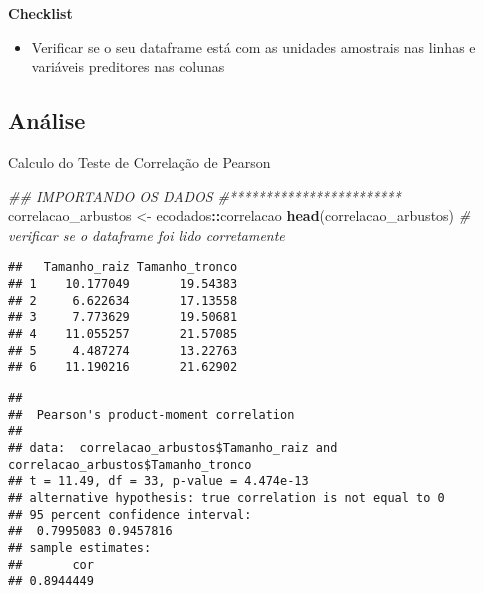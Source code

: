 \documentclass[
]{book}
\newenvironment{Shaded}{\begin{snugshade}}{\end{snugshade}}
\newcommand{\CommentTok}[1]{\textcolor[rgb]{0.56,0.35,0.01}{\textit{#1}}}
\newcommand{\DataTypeTok}[1]{\textcolor[rgb]{0.13,0.29,0.53}{#1}}
\newcommand{\KeywordTok}[1]{\textcolor[rgb]{0.13,0.29,0.53}{\textbf{#1}}}
\newcommand{\NormalTok}[1]{#1}
\newcommand{\OperatorTok}[1]{\textcolor[rgb]{0.81,0.36,0.00}{\textbf{#1}}}
\newcommand{\StringTok}[1]{\textcolor[rgb]{0.31,0.60,0.02}{#1}}
\providecommand{\tightlist}{%
  \setlength{\itemsep}{0pt}\setlength{\parskip}{0pt}}
\begin{document}
\textbf{Checklist}

\begin{itemize}
\tightlist
\item
  Verificar se o seu dataframe está com as unidades amostrais nas linhas e variáveis preditores nas colunas
\end{itemize}

\hypertarget{anuxe1lise-3}{%
\subsection{Análise}\label{anuxe1lise-3}}

Calculo do Teste de Correlação de Pearson

\begin{Shaded}
\begin{Highlighting}[]
\CommentTok{## IMPORTANDO OS DADOS}
\CommentTok{#************************}
\NormalTok{correlacao_arbustos <-}\StringTok{ }\NormalTok{ecodados}\OperatorTok{::}\NormalTok{correlacao}
\KeywordTok{head}\NormalTok{(correlacao_arbustos) }\CommentTok{# verificar se o dataframe foi lido corretamente}
\end{Highlighting}
\end{Shaded}

\begin{verbatim}
##   Tamanho_raiz Tamanho_tronco
## 1    10.177049       19.54383
## 2     6.622634       17.13558
## 3     7.773629       19.50681
## 4    11.055257       21.57085
## 5     4.487274       13.22763
## 6    11.190216       21.62902
\end{verbatim}

\begin{Shaded}
\end{Shaded}

\begin{verbatim}
## 
## 	Pearson's product-moment correlation
## 
## data:  correlacao_arbustos$Tamanho_raiz and correlacao_arbustos$Tamanho_tronco
## t = 11.49, df = 33, p-value = 4.474e-13
## alternative hypothesis: true correlation is not equal to 0
## 95 percent confidence interval:
##  0.7995083 0.9457816
## sample estimates:
##       cor 
## 0.8944449
\end{verbatim}
\end{document}
